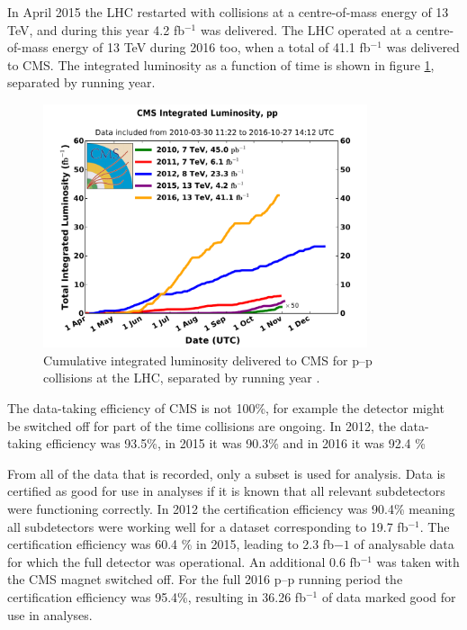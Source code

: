 In April 2015 the \ac{LHC} restarted with collisions at a centre-of-mass energy of 13 TeV, and during 
this year 4.2 fb$^{-1}$ was delivered. The \ac{LHC} operated at a centre-of-mass energy of 13 TeV 
during 2016 too, when a total of 41.1 fb$^{-1}$ was delivered to \ac{CMS}.
The integrated luminosity as a function of time is shown in figure \ref{fig:CMSLHC_intlumi},
separated by running year.

\begin{figure}[h!]
\includegraphics[width=0.85\textwidth]{./Detector/Plots/int_lumi_cumulative_pp_2.pdf}
\caption{Cumulative integrated luminosity delivered to \ac{CMS} for p--p collisions at the \ac{LHC}, separated
by running year \cite{cms-lumi-public}.}
\label{fig:CMSLHC_intlumi}
\end{figure}

The data-taking efficiency of CMS is not 100\%, for example the detector might be
switched off for part of the time collisions are ongoing. In 2012, the data-taking 
efficiency was 93.5\%, in 2015 it was 90.3\% and in 2016 it was 92.4 \%

From all of the data that is recorded, only a subset is used for analysis. Data is 
certified as good for use in analyses if it is known that all relevant subdetectors
were functioning correctly. In 2012 the certification efficiency was 90.4\%
meaning all subdetectors were working well for a dataset corresponding to 19.7 fb$^{-1}$.
The certification efficiency was 60.4 \% in 2015, leading to 2.3 fb${-1}$ of 
analysable data for which the full detector was operational. An additional 0.6 fb$^{-1}$
was taken with the \ac{CMS} magnet switched off. For the full 2016 p--p running period
the certification efficiency was 95.4\%, resulting in 36.26 fb$^{-1}$ of data marked good
for use in analyses.

